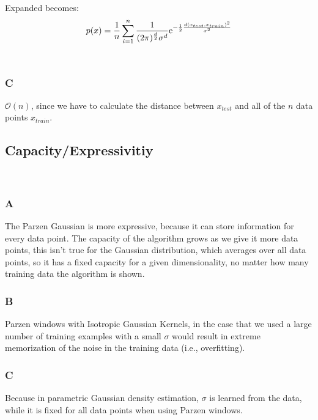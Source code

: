 \documentclass{amsart}
\theoremstyle{definition}
\theoremstyle{remark}
\numberwithin{equation}{section}
\begin{document}
Expanded becomes: \\

\begin{equation}
    p(x) = \frac{1}{n}\sum_{i=1}^{n} \frac{1}{(2\pi)^{\frac{d}{2}} \sigma^d} {\rm e}^{-\frac{1}{2}\frac{d(x_{test}, x_{train})^2}{\sigma^2} }
\end{equation}\\

\subsubsection{C} 

$\mathcal{O}(n)$, since we have to calculate the distance between 
$x_{test}$ and all of the $n$ data points $x_{train}$. \\

\subsection{Capacity/Expressivitiy} \\
\subsubsection{A} 

The Parzen Gaussian is more expressive, because it can store information for
every data point. The capacity of the algorithm grows as we give it more data 
points, this isn't true for the Gaussian distribution, which averages over all 
data points, so it has a fixed capacity for a given dimensionality, no matter 
how many training data the algorithm is shown. \\

\subsubsection{B} 

Parzen windows with Isotropic Gaussian Kernels, in the case that we used a 
large number of training examples with a small $\sigma$ would result in extreme 
memorization of the noise in the training data (i.e., overfitting). \\

\subsubsection{C} 

Because in parametric Gaussian density estimation, $\sigma$ is learned from 
the data, while it is fixed for all data points when using Parzen windows. \\ 
\end{document}
